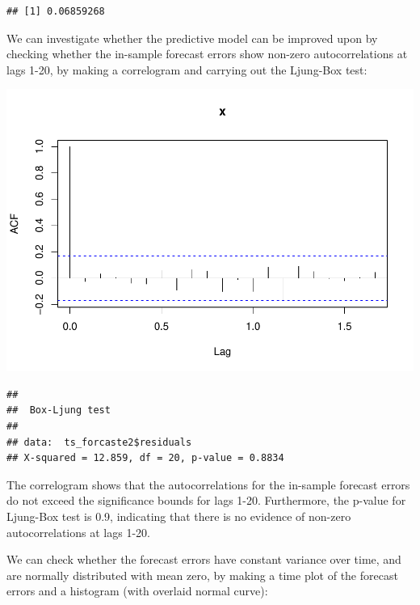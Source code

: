 \documentclass[
]{article}
\newenvironment{Shaded}{\begin{snugshade}}{\end{snugshade}}
\newcommand{\KeywordTok}[1]{\textcolor[rgb]{0.13,0.29,0.53}{\textbf{#1}}}
\newcommand{\NormalTok}[1]{#1}
\newcommand{\OperatorTok}[1]{\textcolor[rgb]{0.81,0.36,0.00}{\textbf{#1}}}
\begin{document}
\begin{verbatim}
## [1] 0.06859268
\end{verbatim}

We can investigate whether the predictive model can be improved upon by
checking whether the in-sample forecast errors show non-zero
autocorrelations at lags 1-20, by making a correlogram and carrying out
the Ljung-Box test:

\includegraphics{tsf_export_files/figure-latex/unnamed-chunk-17-1.pdf}

\begin{verbatim}
## 
##  Box-Ljung test
## 
## data:  ts_forcaste2$residuals
## X-squared = 12.859, df = 20, p-value = 0.8834
\end{verbatim}

The correlogram shows that the autocorrelations for the in-sample
forecast errors do not exceed the significance bounds for lags 1-20.
Furthermore, the p-value for Ljung-Box test is 0.9, indicating that
there is no evidence of non-zero autocorrelations at lags 1-20.

We can check whether the forecast errors have constant variance over
time, and are normally distributed with mean zero, by making a time plot
of the forecast errors and a histogram (with overlaid normal curve):

\begin{Shaded}
\end{Shaded}
\end{document}
